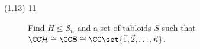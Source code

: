 \documentclass{math174}
\date{Wednesday, February 20}
\author{}
\begin{document}
\begin{description}
\item[(1.13) 11] Find \(H \le \mathcal S_n\) and a set of tabloids
  \(S\) such that
  \(\CC \mathcal H \cong \CC \mathbf S \cong \CC \set{\vec 1, \vec 2,
    \dots, \vec n}\).

  \begin{solution}

  \end{solution}
\end{description}
\end{document}
